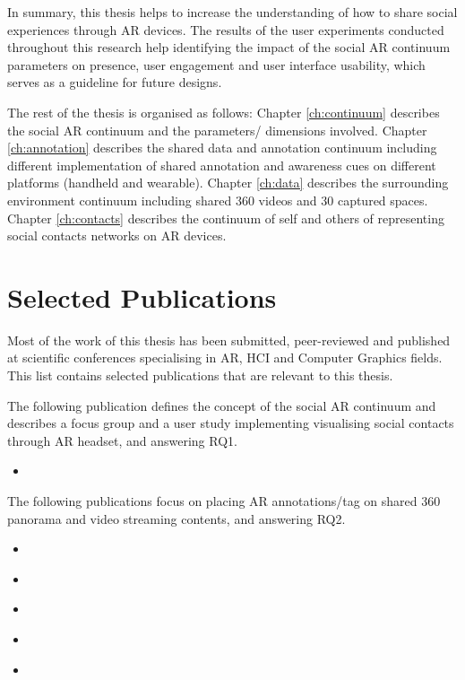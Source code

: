 In summary, this thesis helps to increase the understanding of how to share social experiences through AR devices. The results of the user experiments conducted throughout this research help identifying the impact of the social AR continuum parameters on presence, user engagement and user interface usability, which serves as a guideline for future designs. 

The rest of the thesis is organised as follows: Chapter \ref{ch:continuum} describes the social AR continuum and the parameters/ dimensions involved. Chapter \ref{ch:annotation} describes the shared data and annotation continuum including different implementation of shared annotation and awareness cues on different platforms (handheld and wearable). Chapter \ref{ch:data} describes the surrounding environment continuum including shared 360 videos and 30 captured spaces. Chapter \ref{ch:contacts} describes the continuum of self and others of representing social contacts networks on AR devices. 

\section{Selected Publications}

Most of the work of this thesis has been submitted, peer-reviewed and published at scientific conferences specialising in AR, HCI and Computer Graphics fields. This list contains selected publications that are relevant to this thesis. 

The following publication defines the concept of the social AR continuum and describes a focus group and a user study implementing visualising social contacts through AR headset, and answering RQ1. 

\begin{itemize}
    \item{ }
\end{itemize}

The following publications focus on placing AR annotations/tag on shared 360 panorama and video streaming contents, and answering RQ2.

\begin{itemize}
    \item{ }
    \item{ }
    \item{ }    
    \item{ }
    \item{ }
\end{itemize}

